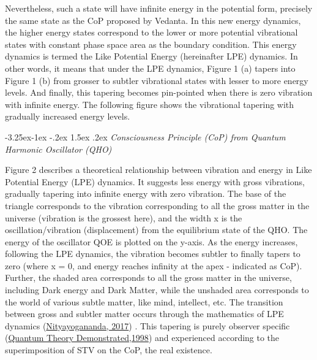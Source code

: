 \documentclass[twoside, 13pt]{article}
\makeatletter
\renewcommand\subsubsection{\@startsection{subsubsection}{3}{\z@}%
                                     {-3.25ex\@plus -1ex \@minus -.2ex}%
                                     {1.5ex \@plus .2ex}%
                                     {\normalfont\large\bfseries}}
\makeatother
\begin{document}
{{Nevertheless, such a state will have infinite energy in the potential form, precisely the same state as the CoP proposed by Vedanta. In this new energy dynamics, the higher energy states correspond to the lower or more potential vibrational states with constant phase space area as the boundary condition. This energy dynamics is termed the Like Potential Energy (hereinafter LPE) dynamics. In other words, it means that under the LPE dynamics, Figure 1 (a) tapers into Figure 1 (b) from grosser to subtler vibrational states with lesser to more energy levels. And finally, this tapering becomes pin-pointed when there is zero vibration with infinite energy. The following figure shows the vibrational tapering with gradually increased energy levels.}

{\fontsize{8}{10}\selectfont\subsubsection{\textit{Consciousness Principle (CoP) from Quantum Harmonic Oscillator (QHO)}}}\label{subsubsec-3.2.1}

{\fontsize{12}{14}\selectfont Figure 2 describes a theoretical relationship between vibration and energy in Like Potential Energy (LPE) dynamics. It suggests less energy with gross vibrations, gradually tapering into infinite energy with zero vibration. The base of the triangle corresponds to the vibration corresponding to all the gross matter in the universe (vibration is the grossest here), and the width x is the oscillation/vibration (displacement) from the equilibrium state of the QHO. The energy of the oscillator QOE is plotted on the y-axis. As the energy increases, following the LPE dynamics, the vibration becomes subtler to finally tapers to zero (where x = 0, and energy reaches infinity at the apex - indicated as CoP). Further, the shaded area corresponds to all the gross matter in the universe, including Dark energy and Dark Matter, while the unshaded area corresponds to the world of various subtle matter, like mind, intellect, etc. The transition between gross and subtler matter occurs through the mathematics of LPE dynamics (\underline{Nityayogananda, 2017}) .  This tapering is purely observer specific (\underline{Quantum Theory Demonstrated,1998}) and experienced according to the superimposition of STV on the CoP, the real existence.}

}
\end{document}
